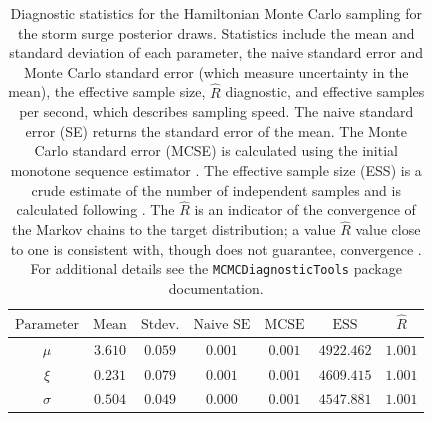 \documentclass[ef,draft]{agutexSI2019}
\begin{document}
\begin{table}[h]
      \centering
      \caption{
            Diagnostic statistics for the Hamiltonian Monte Carlo sampling for the storm surge posterior draws.
            Statistics include the mean and standard deviation of each parameter, the naive standard error and Monte Carlo standard error (which measure uncertainty in the mean), the effective sample size, $\hat{R}$ diagnostic, and effective samples per second, which describes sampling speed.
            The naive standard error (SE) returns the standard error of the mean.
            The Monte Carlo standard error (MCSE) is calculated using the initial monotone sequence estimator \cite[pp.~473-483]{geyer_practical:1992}.
            The effective sample size (ESS) is a crude estimate of the number of independent samples and is calculated following .
            The $\hat{R}$ is an indicator of the convergence of the Markov chains to the target distribution; a value $\hat{R}$ value close to one is consistent with, though does not guarantee, convergence \cite{mcelreath_rethinking2:2020}.
            For additional details see the \texttt{MCMCDiagnosticTools} package documentation.
      }\label{tab:surge-posterior-mcmc-diagnostics}
      \begin{tabular}{ccccccc}
            \toprule
            $\textrm{Parameter}$ & $\textrm{Mean}$ & $\textrm{Stdev.}$ & $\textrm{Naive SE}$ & $\textrm{MCSE}$ & $\textrm{ESS}$ & $\hat{R}$ \\
            \midrule
            $\mu$                & $3.610$         & $0.059$           & $0.001$             & $0.001$         & $4922.462$     & $1.001$   \\
            $\xi$                & $0.231$         & $0.079$           & $0.001$             & $0.001$         & $4609.415$     & $1.001$   \\
            $\sigma$             & $0.504$         & $0.049$           & $0.000$             & $0.001$         & $4547.881$     & $1.001$   \\
            \bottomrule
      \end{tabular}

\end{table}
\end{document}
